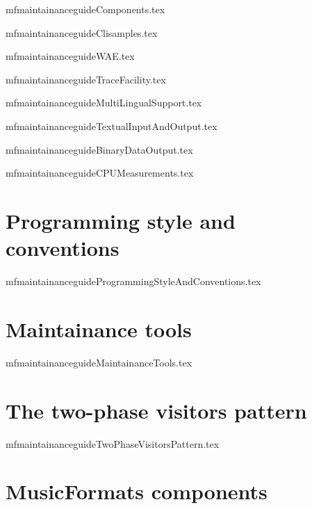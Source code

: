 \documentclass[11pt,a4paper]{report}
\begin{document}
{mfmaintainanceguideComponents.tex}

{mfmaintainanceguideClisamples.tex}

{mfmaintainanceguideWAE.tex}

{mfmaintainanceguideTraceFacility.tex}

{mfmaintainanceguideMultiLingualSupport.tex}

{mfmaintainanceguideTextualInputAndOutput.tex}

{mfmaintainanceguideBinaryDataOutput.tex}

{mfmaintainanceguideCPUMeasurements.tex}


\part{Programming style and conventions}

{mfmaintainanceguideProgrammingStyleAndConventions.tex}


\part{Maintainance tools}

{mfmaintainanceguideMaintainanceTools.tex}


\part{The two-phase visitors pattern}

{mfmaintainanceguideTwoPhaseVisitorsPattern.tex}


\part{MusicFormats components}
\end{document}
